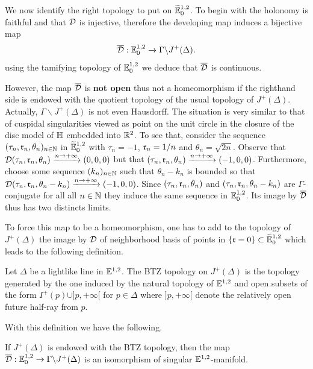 We now identify the right topology to put on ${\widetilde {\mathbb{E}}}^{1,2}_0$. To begin with  the holonomy is faithful and that $\mathcal{D}$ is injective, therefore the developing map induces a bijective map 
$$\overline {\mathcal{D}} :  \mathbb{E}^{1,2}_0 \xrightarrow{} \Gamma\backslash J^+(\Delta).$$
using the tamifying topology of $\mathbb{E}^{1,2}_0$ we deduce that 
 $\overline {\mathcal{D}}$ is continuous.


However, the map $\overline {\mathcal{D}}$ is \textbf{not open} thus not a homeomorphism if the righthand side is endowed with the quotient topology of the usual topology of $J^+(\Delta)$. Actually, $\Gamma\backslash J^+(\Delta)$ is not even Hausdorff. The situation is very similar to that of cuspidal singularities viewed as point on the unit circle in the closure of the disc model of $\mathbb{H}$ embedded into $\mathbb R^2$. 
To see that, consider the sequence $(\tau_n,\mathfrak{r}_n,\theta_n)_{n\in \mathbb{N}}$ in ${\widetilde {\mathbb{E}}}^{1,2}_0$ with $\tau_n=-1$, $\mathfrak{r}_n=1/n$ and $\theta_n=\sqrt{2n}$. Observe that $\mathcal{D}(\tau_n,\mathfrak{r}_n,\theta_n)\xrightarrow{n\rightarrow +\infty} (0,0,0)$ but that $(\tau_n,\mathfrak{r}_n,\theta_n) \xrightarrow{n\rightarrow +\infty} (-1,0,0)$. Furthermore, choose some sequence $(k_n)_{n\in \mathbb{N}}$ such that $\theta_n-k_n$ is bounded so that $\mathcal{D}(\tau_n,\mathfrak{r}_n,\theta_n-k_n)\xrightarrow{n\rightarrow +\infty} (-1,0,0)$. Since $(\tau_n,\mathfrak{r}_n,\theta_n)$ and $(\tau_n,\mathfrak{r}_n,\theta_n-k_n)$ are $\Gamma$-conjugate  for all all $n\in \mathbb{N}$ they induce the same sequence in $\mathbb{E}^{1,2}_0$. 
Its image by $\overline {\mathcal{D}}$ thus has two distincts limits. 

To force this map to be a homeomorphism, one has to add to the topology of $J^+(\Delta)$ the image by $\mathcal{D}$ of neighborhood basis of points in $\{\mathfrak{r}=0\}\subset {\widetilde {\mathbb{E}}}^{1,2}_0$ which leads to the following definition.

\begin{defi}\label{defi:BTZtop} Let $\Delta$ be a lightlike line in ${\mathbb E}^{1,2}_{}$.
The BTZ topology on $J^+(\Delta)$ is the topology generated by the one induced by the natural topology of ${\mathbb E}^{1,2}_{}$ and open subsets of the form $I^+(p)\cup]p,+\infty[$  for  $p\in \Delta$ where $]p,+\infty[$ denote the relatively open future half-ray from $p$.
\end{defi}

With this definition we have the following.
\begin{prop} \label{prop:quotient_chart}
If $J^+(\Delta)$ is endowed with the BTZ topology,
then the map $\overline {\mathcal{D}} : {\mathbb E}^{1,2}_{0}\rightarrow \Gamma\backslash J^+(\Delta)$  is an isomorphism of singular $\mathbb{E}^{1,2}$-manifold.
\end{prop}


